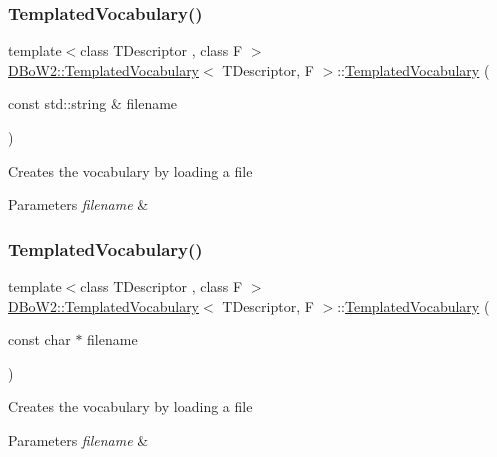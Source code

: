 \subsubsection{\texorpdfstring{Templated\+Vocabulary()}{TemplatedVocabulary()}\hspace{0.1cm}{\footnotesize\ttfamily [2/4]}}
{\footnotesize\ttfamily template$<$class T\+Descriptor , class F $>$ \\
\hyperlink{classDBoW2_1_1TemplatedVocabulary}{D\+Bo\+W2\+::\+Templated\+Vocabulary}$<$ T\+Descriptor, F $>$\+::\hyperlink{classDBoW2_1_1TemplatedVocabulary}{Templated\+Vocabulary} (\begin{DoxyParamCaption}\item[{const std\+::string \&}]{filename }\end{DoxyParamCaption})}

Creates the vocabulary by loading a file 
\begin{DoxyParams}{Parameters}
{\em filename} & \\
\hline
\end{DoxyParams}
\mbox{\label{classDBoW2_1_1TemplatedVocabulary_a255d68e7b4235487f8d2d8ea0cbaf43a}} 
\subsubsection{\texorpdfstring{Templated\+Vocabulary()}{TemplatedVocabulary()}\hspace{0.1cm}{\footnotesize\ttfamily [3/4]}}
{\footnotesize\ttfamily template$<$class T\+Descriptor , class F $>$ \\
\hyperlink{classDBoW2_1_1TemplatedVocabulary}{D\+Bo\+W2\+::\+Templated\+Vocabulary}$<$ T\+Descriptor, F $>$\+::\hyperlink{classDBoW2_1_1TemplatedVocabulary}{Templated\+Vocabulary} (\begin{DoxyParamCaption}\item[{const char $\ast$}]{filename }\end{DoxyParamCaption})}

Creates the vocabulary by loading a file 
\begin{DoxyParams}{Parameters}
{\em filename} & \\
\hline
\end{DoxyParams}
\mbox{\label{classDBoW2_1_1TemplatedVocabulary_aac48ee5331b5d88a4db1a3c93cb0f6a5}} 
